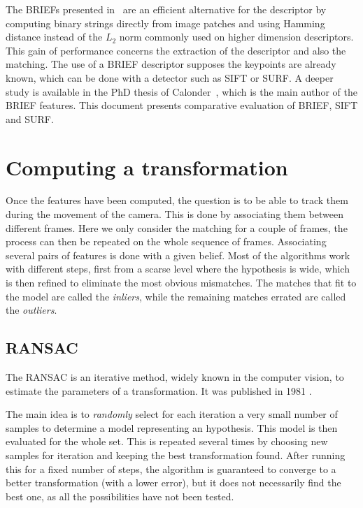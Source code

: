 The \glspl{BRIEF} presented in~\cite{Calonder10-brief} are an efficient alternative for the descriptor by computing  binary strings directly from image patches and using Hamming distance instead of the $L_2$ norm commonly used on higher dimension descriptors. This gain of performance concerns the extraction of the descriptor and also the matching. The use of a \gls{BRIEF} descriptor supposes the keypoints are already known, which can be done with a detector such as \gls{SIFT} or \gls{SURF}. A deeper study is available in the PhD thesis of Calonder~\cite{Calonder10_PhD}, which is the main author of the \gls{BRIEF} features. This document presents comparative evaluation of \gls{BRIEF}, \gls{SIFT} and \gls{SURF}.

\section{Computing a transformation}

Once the features have been computed, the question is to be able to track them during the movement of the camera. This is done by associating them between different frames. Here we only consider the matching for a couple of frames, the process can then be repeated on the whole sequence of frames. Associating several pairs of features is done with a given belief. Most of the algorithms work with different steps, first from a scarse level where the hypothesis is wide, which is then refined to eliminate the most obvious mismatches. The matches that fit to the model are called the \emph{inliers}, while the remaining matches errated are called the \emph{outliers}.

\subsection{RANSAC}
\label{sub:ransac}

The \gls{RANSAC} is an iterative method, widely known in the computer vision, to estimate the parameters of a transformation. It was published in 1981 \cite{FischlerB81}.

The main idea is to \emph{randomly} select for each iteration a very small number of samples to determine a model representing an hypothesis. This model is then evaluated for the whole set. This is repeated several times by choosing new samples for iteration and keeping the best transformation found. After running this for a fixed number of steps, the algorithm is guaranteed to converge to a better transformation (with a lower error), but it does not necessarily find the best one, as all the possibilities have not been tested. 

